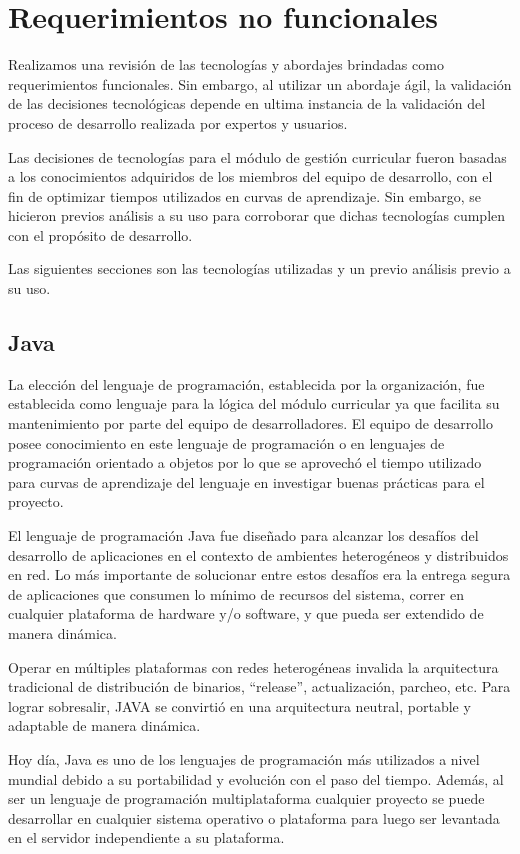 \section{Requerimientos no funcionales}
Realizamos una revisión de las tecnologías y abordajes brindadas como requerimientos funcionales. Sin embargo, al utilizar un abordaje ágil, la validación de las decisiones tecnológicas depende en ultima instancia de la validación del proceso de desarrollo realizada por expertos y usuarios.

Las decisiones de tecnologías para el módulo de gestión curricular fueron basadas a los conocimientos adquiridos de los miembros del equipo de desarrollo, con el fin de optimizar tiempos utilizados en curvas de aprendizaje. Sin embargo, se hicieron previos análisis a su uso para corroborar que dichas tecnologías cumplen con el propósito de desarrollo.

Las siguientes secciones son las tecnologías utilizadas y un previo análisis previo a su uso.

\subsection{Java}
La elección del lenguaje de programación, establecida por la organización, fue establecida como lenguaje para la lógica del módulo curricular ya que facilita su mantenimiento por parte del equipo de desarrolladores. El equipo de desarrollo posee conocimiento en este lenguaje de programación o en lenguajes de programación orientado a objetos por lo que se aprovechó el tiempo utilizado para curvas de aprendizaje del lenguaje en investigar buenas prácticas para el proyecto.

El lenguaje de programación Java fue diseñado para alcanzar los desafíos del desarrollo de aplicaciones en el contexto de ambientes heterogéneos y distribuidos en red. Lo más importante de solucionar entre estos desafíos era la entrega segura de aplicaciones que consumen lo mínimo de recursos del sistema, correr en cualquier plataforma de hardware y/o software, y que pueda ser extendido de manera dinámica.

Operar en múltiples plataformas con redes heterogéneas invalida la arquitectura tradicional de distribución de binarios, “release”, actualización, parcheo, etc. Para lograr sobresalir, JAVA se convirtió en una arquitectura neutral, portable y adaptable de manera dinámica.

Hoy día, Java es uno de los lenguajes de programación más utilizados a nivel mundial debido a su portabilidad y evolución con el paso del tiempo. Además, al ser un lenguaje de programación multiplataforma cualquier proyecto se puede desarrollar en cualquier sistema operativo o plataforma para luego ser levantada en el servidor independiente a su plataforma. 

